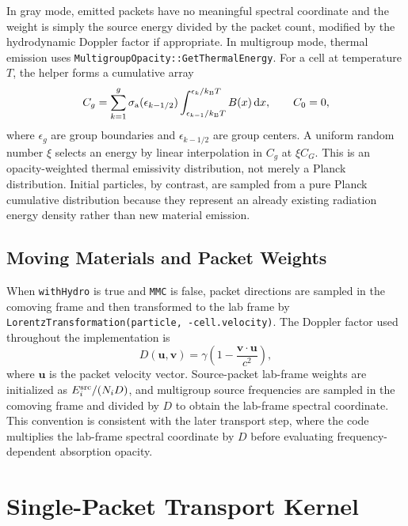\documentclass[11pt]{article}
\newcommand{\sigA}{\sigma_{\rm a}}
\newcommand{\dd}{\mathrm{d}}
\newcommand{\vcell}{\mathbf{v}}
\begin{document}
In gray mode, emitted packets have no meaningful spectral coordinate and the
weight is simply the source energy divided by the packet count, modified by the
hydrodynamic Doppler factor if appropriate. In multigroup mode, thermal
emission uses \texttt{MultigroupOpacity::GetThermalEnergy}. For a cell at
temperature \(T\), the helper forms a cumulative array
\begin{equation}
  C_g =
  \sum_{k=1}^{g}
  \sigA(\epsilon_{k-1/2})
  \int_{\epsilon_{k-1}/k_{\rm B}T}^{\epsilon_k/k_{\rm B}T}
  B(x)\,\dd x ,
  \qquad C_0=0,
  \label{eq:opacity-weighted-thermal-cdf}
\end{equation}
where \(\epsilon_g\) are group boundaries and \(\epsilon_{k-1/2}\) are group
centers. A uniform random number \(\xi\) selects an energy by linear
interpolation in \(C_g\) at \(\xi C_{G}\). This is an opacity-weighted thermal
emissivity distribution, not merely a Planck distribution. Initial particles,
by contrast, are sampled from a pure Planck cumulative distribution because
they represent an already existing radiation energy density rather than new
material emission.

\subsection{Moving Materials and Packet Weights}

When \texttt{withHydro} is true and \texttt{MMC} is false, packet directions
are sampled in the comoving frame and then transformed to the lab frame by
\texttt{LorentzTransformation(particle, -cell.velocity)}. The Doppler factor
used throughout the implementation is
\begin{equation}
  D(\mathbf{u},\vcell)
  =
  \gamma\left(1-\frac{\vcell\cdot\mathbf{u}}{c^2}\right),
  \label{eq:doppler}
\end{equation}
where \(\mathbf{u}\) is the packet velocity vector. Source-packet lab-frame
weights are initialized as \(E^{\rm src}_i/(N_iD)\), and multigroup source
frequencies are sampled in the comoving frame and divided by \(D\) to obtain
the lab-frame spectral coordinate. This convention is consistent with the
later transport step, where the code multiplies the lab-frame spectral
coordinate by \(D\) before evaluating frequency-dependent absorption opacity.

\section{Single-Packet Transport Kernel}
\end{document}
